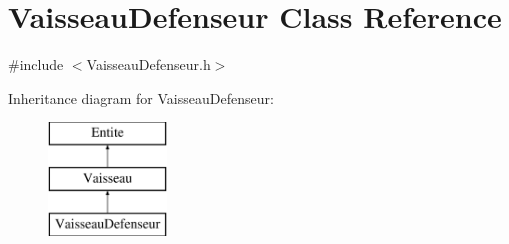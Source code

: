 \hypertarget{class_vaisseau_defenseur}{}\section{Vaisseau\+Defenseur Class Reference}
\label{class_vaisseau_defenseur}


{\ttfamily \#include $<$Vaisseau\+Defenseur.\+h$>$}

Inheritance diagram for Vaisseau\+Defenseur\+:\begin{figure}[H]
\begin{center}
\leavevmode
\includegraphics[height=3.000000cm]{class_vaisseau_defenseur}
\end{center}
\end{figure}
